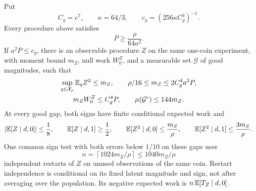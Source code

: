 \begin{lemma}
\label{lem:information-gate}
Put
\[
 C_g=e^7,\qquad \kappa=64/3,\qquad
 c_g=(256\kappa C_g^4)^{-1}.
\]
Every procedure above satisfies
\begin{equation}
 P\ge\frac{\rho}{64a^2}.
 \label{eq:cross-baseline}
\end{equation}
If \(a^2P\le c_g\), there is an observable procedure \(Z\) on the same
one-coin experiment, with moment bound \(m_Z\), null work \(W_0^Z\), and
a measurable set \(\mathcal G\) of good magnitudes, such that
\begin{equation}
 \begin{gathered}
 \sup_{q\in\mathcal X_\rho}\mathbb E_qZ^2\le m_Z,\qquad
 \rho/16\le m_Z\le2C_g^4a^2P,\\
 m_ZW_0^Z\le C_g^4P,\qquad
 \mu(\mathcal G^c)\le144m_Z.
 \end{gathered}
 \label{eq:cross-gate-bounds}
\end{equation}
At every good gap, both signs have finite conditional expected work and
\begin{equation}
 \left|\mathbb E[Z\mid d,0]\right|\le\frac18,\qquad
 \mathbb E[Z\mid d,1]\ge\frac12,\qquad
 \mathbb E[Z^2\mid d,0]\le\frac{m_Z}{\rho},\qquad
 \mathbb E[Z^2\mid d,1]\le\frac{3m_Z}{\rho}.
 \label{eq:cross-gate-good}
\end{equation}
One common sign test with both errors below \(1/10\) on these gaps uses
\begin{equation}
 n=\left\lceil1024m_Z/\rho\right\rceil
 \le1040m_Z/\rho
 \label{eq:cross-gate-restarts}
\end{equation}
independent restarts of \(Z\) on unused observations of the same coin.
Restart independence is conditional on its fixed latent magnitude and
sign, not after averaging over the population.
Its negative expected work is \(n\,\mathbb E[T_Z\mid d,0]\).
\end{lemma}

